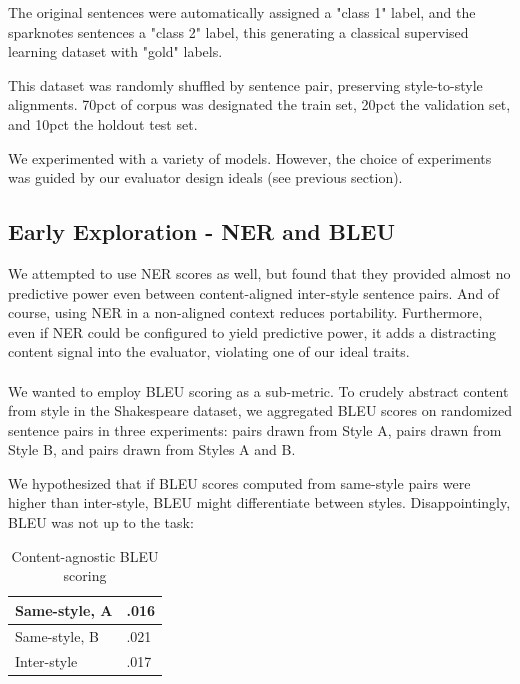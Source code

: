 \documentclass[letterpaper, 10 pt, conference]{ieeeconf}  %
\begin{document}
The original sentences were automatically assigned a "class 1" label, and the sparknotes sentences a "class 2" label, this generating a classical supervised learning dataset with "gold" labels.

This dataset was randomly shuffled by sentence pair, preserving style-to-style alignments. 70pct of corpus was designated the train set, 20pct the validation set, and 10pct the holdout test set.
 
We experimented with a variety of models. However, the choice of experiments was guided by our evaluator design ideals (see previous section).

\subsection{Early Exploration - NER and BLEU}
We attempted to use NER scores as well, but found that they provided almost no predictive power even between content-aligned inter-style sentence pairs. And of course, using NER in a non-aligned context reduces portability. Furthermore, even if NER could be configured to yield predictive power, it adds a distracting content signal into the evaluator, violating one of our ideal traits.
\\ \\

We wanted to employ BLEU scoring as a sub-metric. To crudely abstract content from style in the Shakespeare dataset, we aggregated BLEU scores on randomized sentence pairs in three experiments: pairs drawn from Style A, pairs drawn from Style B, and pairs drawn from Styles A and B.

We hypothesized that if BLEU scores computed from same-style pairs were higher than inter-style, BLEU might differentiate between styles. Disappointingly, BLEU was not up to the task:

\begin{table}[h]
  \caption{Content-agnostic BLEU scoring}
  \label{table_example}
  \begin{center}
    \begin{tabular}{| p{2cm}  | p{2cm} |  }
    \hline
    Same-style, A & .016 \\
    \hline
    Same-style, B & .021\\
    \hline
    Inter-style & .017\\
    \hline
    \end{tabular}
  \end{center}
\end{table}
\end{document}
